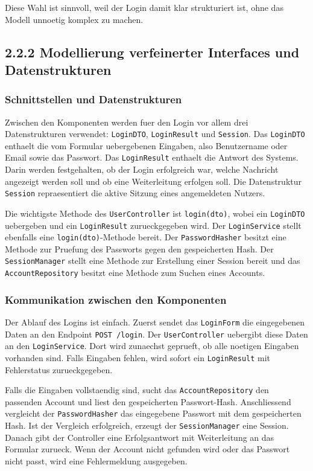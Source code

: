 \documentclass[a4paper,11pt]{article}
\begin{document}
Diese Wahl ist sinnvoll, weil der Login damit klar strukturiert ist, ohne das Modell unnoetig komplex zu machen.

\newpage

\subsection*{2.2.2 Modellierung verfeinerter Interfaces und Datenstrukturen}

\subsubsection*{Schnittstellen und Datenstrukturen}

Zwischen den Komponenten werden fuer den Login vor allem drei Datenstrukturen verwendet: \texttt{LoginDTO}, \texttt{LoginResult} und \texttt{Session}. Das \texttt{LoginDTO} enthaelt die vom Formular uebergebenen Eingaben, also Benutzername oder Email sowie das Passwort. Das \texttt{LoginResult} enthaelt die Antwort des Systems. Darin werden festgehalten, ob der Login erfolgreich war, welche Nachricht angezeigt werden soll und ob eine Weiterleitung erfolgen soll. Die Datenstruktur \texttt{Session} repraesentiert die aktive Sitzung eines angemeldeten Nutzers.

Die wichtigste Methode des \texttt{UserController} ist \texttt{login(dto)}, wobei ein \texttt{LoginDTO} uebergeben und ein \texttt{LoginResult} zurueckgegeben wird. Der \texttt{LoginService} stellt ebenfalls eine \texttt{login(dto)}-Methode bereit. Der \texttt{PasswordHasher} besitzt eine Methode zur Pruefung des Passworts gegen den gespeicherten Hash. Der \texttt{SessionManager} stellt eine Methode zur Erstellung einer Session bereit und das \texttt{AccountRepository} besitzt eine Methode zum Suchen eines Accounts.

\subsubsection*{Kommunikation zwischen den Komponenten}

Der Ablauf des Logins ist einfach. Zuerst sendet das \texttt{LoginForm} die eingegebenen Daten an den Endpoint \texttt{POST /login}. Der \texttt{UserController} uebergibt diese Daten an den \texttt{LoginService}. Dort wird zunaechst geprueft, ob alle noetigen Eingaben vorhanden sind. Falls Eingaben fehlen, wird sofort ein \texttt{LoginResult} mit Fehlerstatus zurueckgegeben.

Falls die Eingaben vollstaendig sind, sucht das \texttt{AccountRepository} den passenden Account und liest den gespeicherten Passwort-Hash. Anschliessend vergleicht der \texttt{PasswordHasher} das eingegebene Passwort mit dem gespeicherten Hash. Ist der Vergleich erfolgreich, erzeugt der \texttt{SessionManager} eine Session. Danach gibt der Controller eine Erfolgsantwort mit Weiterleitung an das Formular zurueck. Wenn der Account nicht gefunden wird oder das Passwort nicht passt, wird eine Fehlermeldung ausgegeben.
\end{document}
